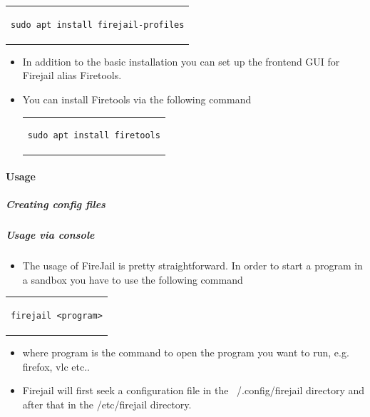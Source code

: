 \documentclass[a4paper,10pt]{article}
\begin{document}
\begin{center}
\begin{tabular}{c}
\begin{lstlisting}
sudo apt install firejail-profiles
\end{lstlisting}
\end{tabular}
\end{center}

\begin{itemize}[leftmargin=*]
\item In addition to the basic installation you can set up the frontend GUI for Firejail alias Firetools.
\item You can install Firetools via the following command

\begin{center}
\begin{tabular}{c}
\begin{lstlisting}
sudo apt install firetools
\end{lstlisting}
\end{tabular}
\end{center}


\end{itemize}




\paragraph{Usage}

\subparagraph{Creating config files}


\subparagraph{Usage via console}

\begin{itemize}[leftmargin=*]
\item The usage of FireJail is pretty straightforward. In order to start a program in a sandbox you have to use the following command
\end{itemize}

\begin{center}
\begin{tabular}{c}
\begin{lstlisting}
firejail <program>
\end{lstlisting}
\end{tabular}
\end{center}

\begin{itemize}[leftmargin=*]
\item where program is the command to open the program you want to run, e.g. firefox, vlc etc..
\item Firejail will first seek a configuration file in the ~/.config/firejail directory and after that in the /etc/firejail directory.
\end{itemize}
\end{document}
